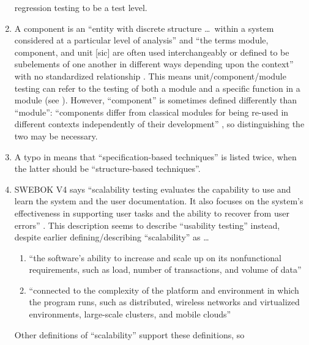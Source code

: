 \begin{enumerate}
            regression testing to be a test level.
      \item A component is an ``entity with discrete structure \dots\ within a
            system considered at a particular level of analysis''
            \citep{ISO_IEC2023b} and ``the terms module, component, and unit
                  [sic] are often used interchangeably or defined to be subelements
            of one another in different ways depending upon the context'' with
            no standardized relationship \citep[p.~82]{IEEE2017}. This means
            unit/component/module testing can refer to the testing of both a
            module and a specific function in a module (see ).
            However, ``component'' is sometimes defined differently than
            ``module'': ``components differ from classical modules for being
            re-used in different contexts independently of their development''
            \citep[p.~107]{BaresiAndPezzè2006}, so distinguishing the two
            may be necessary.
      \item A typo in \citep[Fig.~2]{IEEE2021} means that ``specification-based
            techniques'' is listed twice, when the latter should be
            ``structure-based techniques''.
      \item SWEBOK V4 says ``scalability testing evaluates the capability to
            use and learn the system and the user documentation. It also focuses
            on the system's effectiveness in supporting user tasks and the
            ability to recover from user errors'' \citep[p.~5-9]{SWEBOK2024}.
            This description seems to describe ``usability testing'' instead,
            despite earlier defining/describing ``scalability'' as \ldots
            \begin{enumerate}
                  \item ``the software's ability to increase and scale up on its
                        nonfunctional requirements, such as load, number of
                        transactions, and volume of data'' \citep[p.~5-5]{SWEBOK2024}
                  \item ``connected to the complexity of the platform and
                        environment in which the program runs, such as
                        distributed, wireless networks and virtualized
                        environments, large-scale clusters, and mobile clouds''
                        \citep[p.~5-5]{SWEBOK2024}
            \end{enumerate}
            Other definitions of ``scalability'' support these definitions, so

\end{enumerate}
